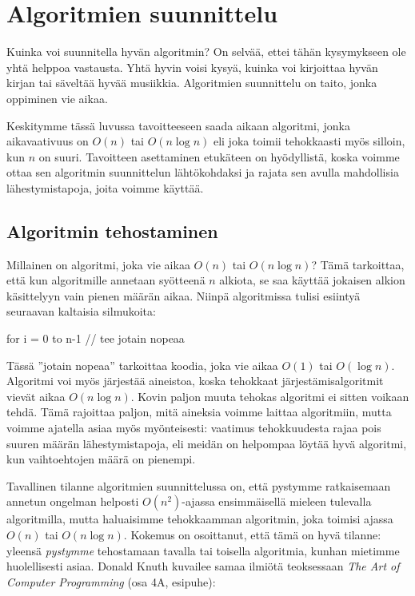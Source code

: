 \chapter{Algoritmien suunnittelu}

Kuinka voi suunnitella hyvän algoritmin?
On selvää, ettei tähän kysymykseen ole yhtä helppoa vastausta.
Yhtä hyvin voisi kysyä, kuinka voi kirjoittaa hyvän kirjan
tai säveltää hyvää musiikkia.
Algoritmien suunnittelu on taito, jonka oppiminen vie aikaa.

Keskitymme tässä luvussa tavoitteeseen
saada aikaan algoritmi, jonka aikavaativuus on $O(n)$ tai $O(n \log n)$
eli joka toimii tehokkaasti myös silloin, kun $n$ on suuri.
Tavoitteen asettaminen etukäteen on hyödyllistä,
koska voimme ottaa sen algoritmin suunnittelun
lähtökohdaksi ja rajata sen avulla mahdollisia
lähestymistapoja, joita voimme käyttää.

\section{Algoritmin tehostaminen}

Millainen on algoritmi, joka vie aikaa $O(n)$ tai $O(n \log n)$?
Tämä tarkoittaa,
että kun algoritmille annetaan syötteenä $n$ alkiota,
se saa käyttää jokaisen alkion käsittelyyn
vain pienen määrän aikaa.
Niinpä algoritmissa tulisi esiintyä seuraavan kaltaisia silmukoita:

\begin{code}
for i = 0 to n-1
    // tee jotain nopeaa
\end{code}

Tässä ''jotain nopeaa'' tarkoittaa koodia, joka vie aikaa
$O(1)$ tai $O(\log n)$.
Algoritmi voi myös järjestää aineistoa,
koska tehokkaat järjestämisalgoritmit vievät aikaa $O(n \log n)$.
Kovin paljon muuta tehokas algoritmi ei sitten voikaan tehdä.
Tämä rajoittaa paljon, mitä aineksia voimme laittaa algoritmiin,
mutta voimme ajatella asiaa myös myönteisesti:
vaatimus tehokkuudesta rajaa pois suuren määrän lähestymistapoja,
eli meidän on helpompaa löytää hyvä algoritmi,
kun vaihtoehtojen määrä on pienempi.

Tavallinen tilanne algoritmien suunnittelussa on,
että pystymme ratkaisemaan annetun ongelman
helposti $O(n^2)$-ajassa ensimmäisellä mieleen tulevalla algoritmilla,
mutta haluaisimme tehokkaamman algoritmin,
joka toimisi ajassa $O(n)$ tai $O(n \log n)$.
Kokemus on osoittanut, että tämä on hyvä tilanne:
yleensä \emph{pystymme} tehostamaan
tavalla tai toisella algoritmia,
kunhan mietimme huolellisesti asiaa.
Donald Knuth kuvailee samaa ilmiötä teoksessaan
\emph{The Art of Computer Programming} (osa 4A, esipuhe):

